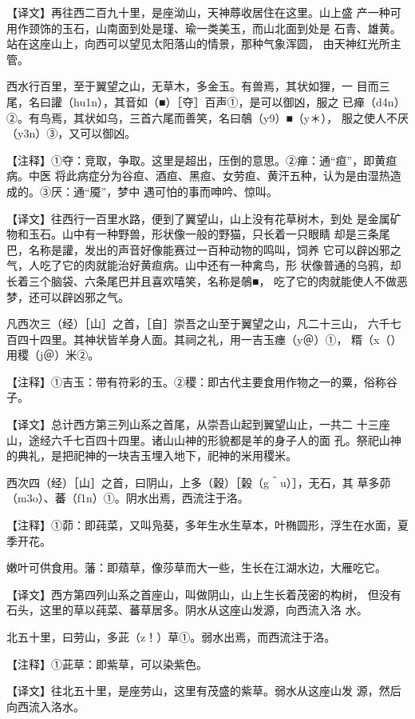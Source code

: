 \documentclass[a4paper,12pt,UTF8,twoside]{ctexbook}
\begin{document}
【译文】再往西二百九十里，是座泑山，天神蓐收居住在这里。山上盛 产一种可用作颈饰的玉石，山南面到处是瑾、瑜一类美玉，而山北面到处是 石青、雄黄。站在这座山上，向西可以望见太阳落山的情景，那种气象浑圆， 由天神红光所主管。

西水行百里，至于翼望之山，无草木，多金玉。有兽焉，其状如狸，一 目而三尾，名曰讙（hu1n），其音如（■）［夺］百声①，是可以御凶，服之 已瘅（d4n）②。有鸟焉，其状如乌，三首六尾而善笑，名曰鵸（y9）■（y＊）， 服之使人不厌（y3n）③，又可以御凶。

【注释】①夺：竞取，争取。这里是超出，压倒的意思。②瘅：通“疸”，即黄疸病。中医 将此病症分为谷疸、酒疸、黑疸、女劳疸、黄汗五种，认为是由湿热造成的。③厌：通“魇”，梦中 遇可怕的事而呻吟、惊叫。

【译文】往西行一百里水路，便到了翼望山，山上没有花草树木，到处 是金属矿物和玉石。山中有一种野兽，形状像一般的野猫，只长着一只眼睛 却是三条尾巴，名称是讙，发出的声音好像能赛过一百种动物的鸣叫，饲养 它可以辟凶邪之气，人吃了它的肉就能治好黄疸病。山中还有一种禽鸟，形 状像普通的乌鸦，却长着三个脑袋、六条尾巴并且喜欢嘻笑，名称是鵸■， 吃了它的肉就能使人不做恶梦，还可以辟凶邪之气。

凡西次三（经）［山］之首，［自］崇吾之山至于翼望之山，凡二十三山， 六千七百四十四里。其神状皆羊身人面。其祠之礼，用一吉玉瘗（y＠）①， 糈（x（）用稷（j＠）米②。

【注释】①吉玉：带有符彩的玉。②稷：即古代主要食用作物之一的粟，俗称谷子。

【译文】总计西方第三列山系之首尾，从崇吾山起到翼望山止，一共二 十三座山，途经六千七百四十四里。诸山山神的形貌都是羊的身子人的面 孔。祭祀山神的典礼，是把祀神的一块吉玉埋入地下，祀神的米用稷米。

西次四（经）［山］之首，曰阴山，上多（穀）［榖（g＾u）］，无石，其 草多茆（m3o）、蕃（f1n）①。阴水出焉，西流注于洛。

【注释】①茆：即莼菜，又叫凫葵，多年生水生草本，叶椭圆形，浮生在水面，夏季开花。

嫩叶可供食用。藩：即薠草，像莎草而大一些，生长在江湖水边，大雁吃它。

【译文】西方第四列山系之首座山，叫做阴山，山上生长着茂密的构树， 但没有石头，这里的草以莼菜、蕃草居多。阴水从这座山发源，向西流入洛 水。

北五十里，曰劳山，多茈（z！）草①。弱水出焉，而西流注于洛。

【注释】①茈草：即紫草，可以染紫色。

【译文】往北五十里，是座劳山，这里有茂盛的紫草。弱水从这座山发 源，然后向西流入洛水。
\end{document}
